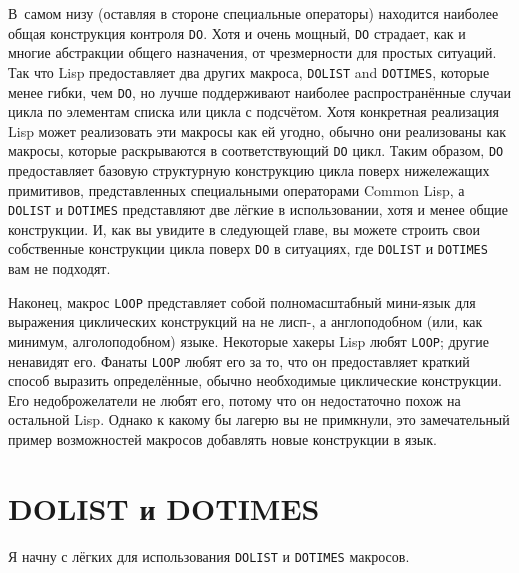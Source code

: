 В~самом низу (оставляя в стороне специальные операторы) находится наиболее общая
конструкция контроля \lstinline{DO}. Хотя и очень мощный, \lstinline{DO} страдает, как и многие
абстракции общего назначения, от чрезмерности для простых ситуаций. Так что Lisp
предоставляет два других макроса, \lstinline{DOLIST} and \lstinline{DOTIMES}, которые менее гибки,
чем \lstinline{DO}, но лучше поддерживают наиболее распространённые случаи цикла по элементам
списка или цикла с подсчётом. Хотя конкретная реализация Lisp может реализовать эти
макросы как ей угодно, обычно они реализованы как макросы, которые раскрываются в
соответствующий \lstinline{DO} цикл. Таким образом, \lstinline{DO} предоставляет базовую структурную
конструкцию цикла поверх нижележащих примитивов, представленных специальными операторами
Common Lisp, а \lstinline{DOLIST} и \lstinline{DOTIMES} представляют две лёгкие в использовании,
хотя и менее общие конструкции. И, как вы увидите в следующей главе, вы можете строить
свои собственные конструкции цикла поверх \lstinline{DO} в ситуациях, где \lstinline{DOLIST} и
\lstinline{DOTIMES} вам не подходят.

Наконец, макрос \lstinline{LOOP} представляет собой полномасштабный мини-язык для выражения
циклических конструкций на не лисп-, а англоподобном (или, как минимум, алголоподобном)
языке. Некоторые хакеры Lisp любят \lstinline{LOOP}; другие ненавидят его. Фанаты \lstinline{LOOP}
любят его за то, что он предоставляет краткий способ выразить определённые, обычно
необходимые циклические конструкции. Его недоброжелатели не любят его, потому что он
недостаточно похож на остальной Lisp. Однако к какому бы лагерю вы не примкнули, это
замечательный пример возможностей макросов добавлять новые конструкции в язык.

\section{DOLIST и DOTIMES}

Я начну с лёгких для использования \lstinline{DOLIST} и \lstinline{DOTIMES} макросов.

